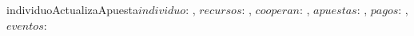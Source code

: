 \documentclass[document.tex]{subfiles}
\begin{document}
\begin{proc}{individuoActualizaApuesta}{\In $individuo$: \nat, \In $recursos$: \TLista{\float}, \In $cooperan$: \TLista{\bool}, \Inout $apuestas$: \TLista{\TLista{\float}}, \In $pagos$: \TLista{\TLista{\float}}, \In $eventos$: \TLista{\TLista{\nat}}}{\\
	\requiere {}
}
\end{proc}
\end{document}
